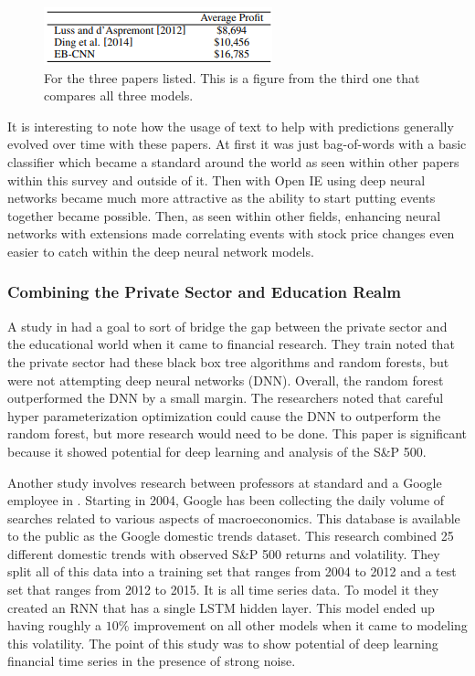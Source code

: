 \documentclass{article}
\theoremstyle{plain}
\theoremstyle{definition}
\numberwithin{equation}{section}
\numberwithin{theorem}{section}
\numberwithin{lemma}{section}
\numberwithin{definition}{section}
\numberwithin{proposition}{section}
\numberwithin{corollary}{section}
\begin{document}
	\begin{figure}[h]
		\includegraphics[width=\linewidth]{dollars}
		\caption{For the three papers listed. This is a figure from the third one \cite{Ding2015DeepLF} that compares all three models.}
	\end{figure}
	
	It is interesting to note how the usage of text to help with predictions generally evolved over time with these papers. At first it was just bag-of-words with a basic classifier which became a standard around the world as seen within other papers within this survey and outside of it. Then with Open IE using deep neural networks became much more attractive as the ability to start putting events together became possible. Then, as seen within other fields, enhancing neural networks with extensions made correlating events with stock price changes even easier to catch within the deep neural network models.
	
	\subsubsection{Combining the Private Sector and Education Realm}
	A study in \cite{Krauss2016} had a goal to sort of bridge the gap between the private sector and the educational world when it came to financial research. They train noted that the private sector had these black box tree algorithms and random forests, but were not attempting deep neural networks (DNN). Overall, the random forest outperformed the DNN by a small margin. The researchers noted that careful hyper parameterization optimization could cause the DNN to outperform the random forest, but more research would need to be done. This paper is significant because it showed potential for deep learning and analysis of the S\&P 500.
	
	
	Another study involves research between professors at standard and a Google employee in \cite{Xiong2015}. Starting in 2004, Google has been collecting the daily volume of searches related to various aspects of macroeconomics. This database is available to the public as the Google domestic trends dataset. This research combined 25 different domestic trends with observed S\&P 500 returns and volatility. They split all of this data into a training set that ranges from 2004 to 2012 and a test set that ranges from 2012 to 2015. It is all time series data. To model it they created an RNN that has a single LSTM hidden layer. This model ended up having roughly a $10\%$ improvement on all other models when it came to modeling this volatility. The point of this study was to show potential of deep learning financial time series in the presence of strong noise.
	
\end{document}
